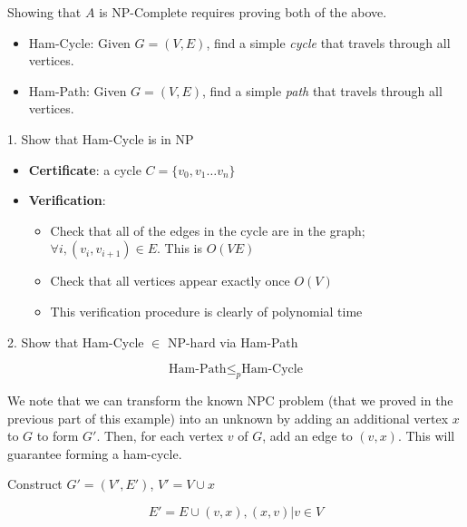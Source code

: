 \documentclass[../notes.tex]{subfiles}
\begin{document}
Showing that $ A $ is NP-Complete requires proving both of the above.






\begin{example}

	\begin{itemize}
		\item Ham-Cycle: Given $ G = (V,E) $, find a simple \textit{cycle} that travels through all vertices.
		\item Ham-Path: Given $ G = (V,E) $, find a simple \textit{path} that travels through all vertices.
	\end{itemize}


	1. Show that Ham-Cycle is in NP

	\begin{itemize}
		\item \textbf{Certificate}: a cycle $ C = \{v_0, v_1 \ldots v_n \}  $
		\item \textbf{Verification}: 
			\begin{itemize}
				\item Check that all of the edges in the cycle are in the graph; $ \forall i, (v_i, v_{i+1}) \in E$. This is $ O(VE) $
				\item Check that all vertices appear exactly once $ O(V) $
				\item This verification procedure is clearly of polynomial time
			\end{itemize}

	\end{itemize}

	2. Show that Ham-Cycle $ \in $ NP-hard via Ham-Path


	\begin{equation}
		\text{Ham-Path} \le_p \text{Ham-Cycle}
	\end{equation}

	We note that we can transform the known NPC problem (that we proved in the previous part of this example) into an unknown by adding an additional vertex $ x $ to $ G $ to form $ G' $. Then, for each vertex $ v $ of $ G $, add an edge to $ (v, x) $. This will guarantee forming a ham-cycle.

	Construct $ G' = (V', E') $, $ V' = V \cup {x}  $

	\begin{equation}
		E' = E \cup {(v,x), (x,v) | v \in V}
	\end{equation}


\end{example}
\end{document}

